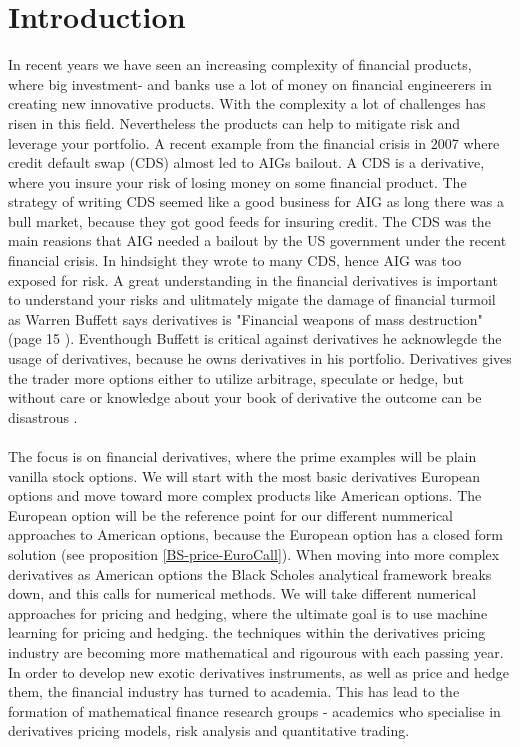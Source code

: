 
\chapter{Introduction} %

\label{Chapter1} %

In recent years we have seen an increasing complexity of financial products, where big investment- and banks use a lot of money on financial engineerers in creating new innovative products. With the complexity a lot of challenges has risen in this field. Nevertheless the products can help to mitigate risk and leverage your portfolio. A recent example from the financial crisis in 2007 where credit default swap (CDS) almost led to AIGs bailout. A CDS is a derivative, where you insure your risk of losing money on some financial product. The strategy of writing CDS seemed like a good business for AIG as long there was a bull market, because they got good feeds for insuring credit. The CDS was the main reasions that AIG needed a bailout by the US government under the recent financial crisis. In hindsight they wrote to many CDS, hence AIG was too exposed for risk. A great understanding in the financial derivatives is important to understand your risks and ulitmately migate the damage of financial turmoil as Warren Buffett says derivatives is "Financial weapons of mass destruction" (page 15 \parencite{Buffett02}). Eventhough Buffett is critical against derivatives he acknowlegde the usage of derivatives, because he owns derivatives in his portfolio. Derivatives gives the trader more options either to utilize arbitrage, speculate or hedge, but without care or knowledge about your book of derivative the outcome can be disastrous  \parencite{Buffett08}.
\\
\\
The focus is on financial derivatives, where the prime examples will be plain vanilla stock options. We will start with the most basic derivatives European options and move toward more complex products like American options. The European option will be the reference point for our different nummerical approaches to American options, because the European option has a closed form solution (see proposition \ref{BS-price-EuroCall}). When moving into more complex derivatives as American options the Black Scholes analytical framework breaks down, and this calls for numerical methods. We will take different numerical approaches for pricing and hedging, where the ultimate goal is to use machine learning for pricing and hedging.
the techniques within the derivatives pricing industry are becoming more mathematical and rigourous with each passing year. In order to develop new exotic derivatives instruments, as well as price and hedge them, the financial industry has turned to academia. This has lead to the formation of mathematical finance research groups - academics who specialise in derivatives pricing models, risk analysis and quantitative trading.